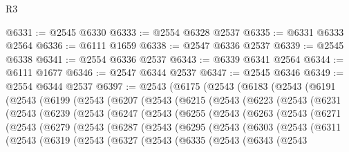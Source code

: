 \begin{lexlean}{R3}
\begin{coremodule}
@6331 := @2545 @6330
@6333 := @2554 @6328 @2537
@6335 := @6331 @6333 @2564
@6336 := @6111 @1659
@6338 := @2547 @6336 @2537
@6339 := @2545 @6338
@6341 := @2554 @6336 @2537
@6343 := @6339 @6341 @2564
@6344 := @6111 @1677
@6346 := @2547 @6344 @2537
@6347 := @2545 @6346
@6349 := @2554 @6344 @2537
@6397 := @2543
    (@6175
      (@2543
        (@6183
          (@2543
            (@6191
              (@2543
                (@6199
                  (@2543
                    (@6207
                      (@2543
                        (@6215
                          (@2543
                            (@6223
                              (@2543
                                (@6231
                                  (@2543
                                    (@6239
                                      (@2543
                                        (@6247
                                          (@2543
                                            (@6255
                                              (@2543
                                                (@6263
                                                  (@2543
                                                    (@6271
                                                      (@2543
                                                        (@6279
                                                          (@2543
                                                            (@6287
                                                              (@2543
                                                                (@6295
                                                                  (@2543
                                                                    (@6303
                                                                      (@2543
                                                                        (@6311
                                                                          (@2543
                                                                            (@6319
                                                                              (@2543
                                                                                (@6327
                                                                                  (@2543
                                                                                    (@6335
                                                                                      (@2543
                                                                                        (@6343
                                                                                          (@2543

\end{coremodule}
\end{lexlean}
